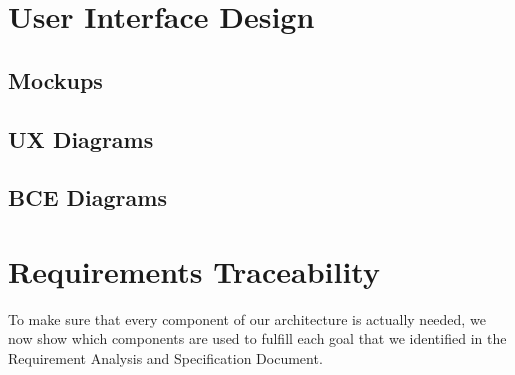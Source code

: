 \documentclass[english]{article}
\begin{document}
\newpage

\section{User Interface Design}

\subsection{Mockups}

\subsection{UX Diagrams}

\subsection{BCE Diagrams}

\newpage

\section{Requirements Traceability}
To make sure that every component of our architecture is actually needed, we now show which components are used to fulfill each goal that we identified in the Requirement Analysis and Specification Document.
\end{document}
